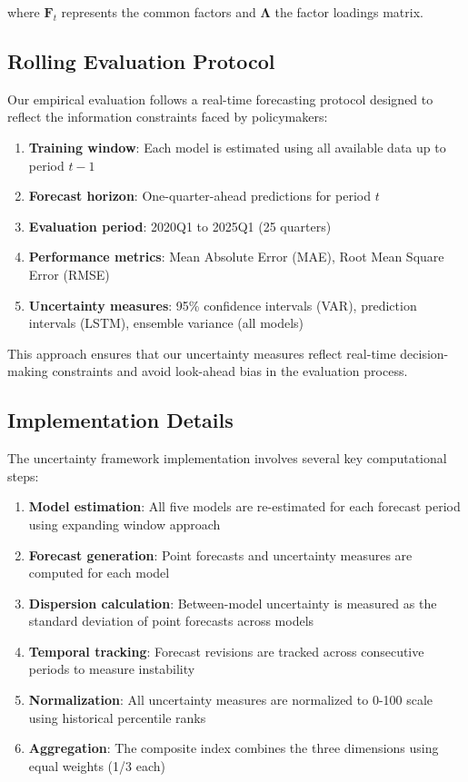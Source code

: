 \documentclass[5p,authoryear]{elsarticle}
\begin{document}
where $\mathbf{F}_t$ represents the common factors and $\boldsymbol{\Lambda}$ the factor loadings matrix.

\subsection{Rolling Evaluation Protocol}

Our empirical evaluation follows a real-time forecasting protocol designed to reflect the information constraints faced by policymakers:

\begin{enumerate}
    \item \textbf{Training window}: Each model is estimated using all available data up to period $t-1$
    \item \textbf{Forecast horizon}: One-quarter-ahead predictions for period $t$
    \item \textbf{Evaluation period}: 2020Q1 to 2025Q1 (25 quarters)
    \item \textbf{Performance metrics}: Mean Absolute Error (MAE), Root Mean Square Error (RMSE)
    \item \textbf{Uncertainty measures}: 95\% confidence intervals (VAR), prediction intervals (LSTM), ensemble variance (all models)
\end{enumerate}

This approach ensures that our uncertainty measures reflect real-time decision-making constraints and avoid look-ahead bias in the evaluation process.

\subsection{Implementation Details}

The uncertainty framework implementation involves several key computational steps:

\begin{enumerate}
    \item \textbf{Model estimation}: All five models are re-estimated for each forecast period using expanding window approach
    \item \textbf{Forecast generation}: Point forecasts and uncertainty measures are computed for each model
    \item \textbf{Dispersion calculation}: Between-model uncertainty is measured as the standard deviation of point forecasts across models
    \item \textbf{Temporal tracking}: Forecast revisions are tracked across consecutive periods to measure instability
    \item \textbf{Normalization}: All uncertainty measures are normalized to 0-100 scale using historical percentile ranks
    \item \textbf{Aggregation}: The composite index combines the three dimensions using equal weights (1/3 each)
\end{enumerate}
\end{document}
